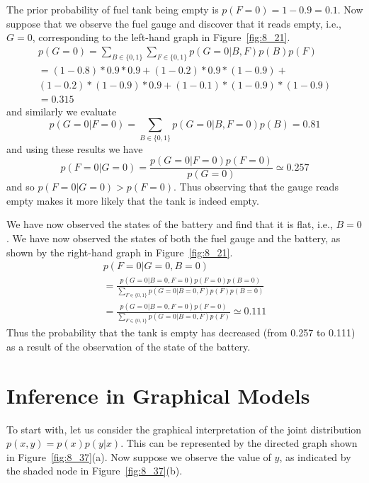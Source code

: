 \documentclass[5p,sort&compress]{elsarticle}
\begin{document}
The prior probability of  fuel tank being empty is $p(F=0) = 1 - 0.9 = 0.1$. Now suppose that we observe the fuel gauge and discover that it reads empty, i.e., $G=0$, corresponding to the left-hand graph in Figure~\ref{fig:8_21}.
\begin{equation}
\begin{aligned}
p(G=0)=\sum_{B \in\{0,1\}} \sum_{F \in\{0,1\}} p(G=0 | B, F) p(B) p(F) \\
= (1-0.8)*0.9*0.9 + (1-0.2)*0.9*(1-0.9) + \\
(1-0.2)*(1-0.9)*0.9 + (1-0.1)*(1-0.9)*(1-0.9) \\
=0.315
\end{aligned}
\end{equation}
and similarly we evaluate
\begin{equation}
p(G=0 | F=0)=\sum_{B \in\{0,1\}} p(G=0 | B, F=0) p(B)=0.81
\end{equation}
and using these results we have
\begin{equation}
p(F=0 | G=0)=\frac{p(G=0 | F=0) p(F=0)}{p(G=0)} \simeq 0.257
\end{equation}
and so $p(F=0|G=0) > p(F=0)$. Thus observing that the gauge reads empty makes it more likely that the tank is indeed empty.

We have now observed the states of the battery and find that it is flat, i.e., $B=0$. We have now observed the states of both the fuel gauge and the battery, as shown by the right-hand graph in Figure~\ref{fig:8_21}.
\begin{equation}
\begin{aligned}
p(F=0 | G=0, B=0) \\
= \frac{p(G=0 | B=0, F=0) p(F=0) p(B=0)}{\sum_{F \in\{0,1\}} p(G=0 | B=0, F) p(F) p(B=0)} \\
= \frac{p(G=0 | B=0, F=0) p(F=0)}{\sum_{F \in\{0,1\}} p(G=0 | B=0, F) p(F)} \simeq 0.111
\end{aligned}
\end{equation}
Thus the probability that the tank is empty has decreased (from 0.257 to 0.111) as a result of the observation of the state of the battery.


\section{Inference in Graphical Models}

To start with, let us consider the graphical interpretation of the joint distribution $p(x,y) = p(x)p(y|x)$. This can be represented by the directed graph shown in Figure~\ref{fig:8_37}(a). Now suppose we observe the value of $y$, as indicated by the shaded node in Figure~\ref{fig:8_37}(b).
\end{document}
